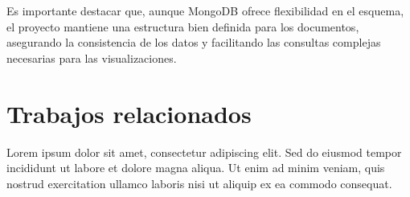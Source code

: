 Es importante destacar que, aunque MongoDB ofrece flexibilidad en el esquema, el proyecto mantiene una estructura bien definida para los documentos, asegurando la consistencia de los datos y facilitando las consultas complejas necesarias para las visualizaciones.

\section{Trabajos relacionados}

Lorem ipsum dolor sit amet, consectetur adipiscing elit. Sed do eiusmod tempor incididunt ut labore et dolore magna aliqua. Ut enim ad minim veniam, quis nostrud exercitation ullamco laboris nisi ut aliquip ex ea commodo consequat.
